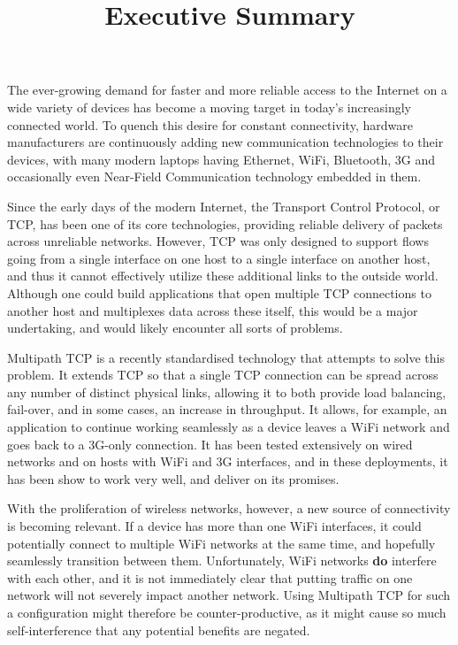 \documentclass[12pt,a4paper]{article}
\title{\vspace{-5ex}Executive Summary}
\author{\vspace{-5ex}}
\date{\vspace{-5ex}}
\begin{document}
\maketitle
\doublespacing
The ever-growing demand for faster and more reliable access to the Internet on a
wide variety of devices has become a moving target in today's increasingly
connected world. To quench this desire for constant connectivity, hardware
manufacturers are continuously adding new communication technologies to their
devices, with many modern laptops having Ethernet, WiFi, Bluetooth, 3G and
occasionally even Near-Field Communication technology embedded in them.

Since the early days of the modern Internet, the Transport Control Protocol, or
TCP, has been one of its core technologies, providing reliable delivery of
packets across unreliable networks. However, TCP was only designed to support
flows going from a single interface on one host to a single interface on another
host, and thus it cannot effectively utilize these additional links to the
outside world. Although one could build applications that open multiple TCP
connections to another host and multiplexes data across these itself, this would
be a major undertaking, and would likely encounter all sorts of problems.

Multipath TCP is a recently standardised technology that attempts to solve this
problem. It extends TCP so that a single TCP connection can be spread across any
number of distinct physical links, allowing it to both provide load balancing,
fail-over, and in some cases, an increase in throughput. It allows, for example,
an application to continue working seamlessly as a device leaves a WiFi network
and goes back to a 3G-only connection. It has been tested extensively on wired
networks and on hosts with WiFi and 3G interfaces, and in these deployments,
it has been show to work very well, and deliver on its promises.

With the proliferation of wireless networks, however, a new source of
connectivity is becoming relevant. If a device has more than one WiFi
interfaces, it could potentially connect to multiple WiFi networks at the same
time, and hopefully seamlessly transition between them. Unfortunately, WiFi
networks \textbf{do} interfere with each other, and it is not immediately clear
that putting traffic on one network will not severely impact another network.
Using Multipath TCP for such a configuration might therefore be
counter-productive, as it might cause so much self-interference that any
potential benefits are negated.
\end{document}
